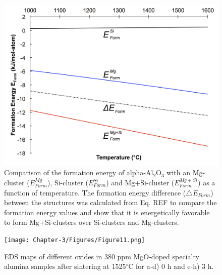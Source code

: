 \newpage
\begin{figure}[H]
	\centering
	\includegraphics[width=\textwidth]{Chapter-3/Figures/Figure10.png}
	\caption{Comparison of the formation energy of alpha-Al$_{2}$O$_{3}$ with an Mg-cluster ($E_{Form}^{Mg}$), Si-cluster ($E_{Form}^{Si}$) and Mg+Si-cluster ($E_{Form}^{Mg+Si}$) as a function of temperature. The formation energy difference ($\bigtriangleup E_{Form}$) between the structures was calculated from Eq. REF to compare the formation energy values and show that it is energetically favorable to form Mg+Si-clusters over Si-clusters and Mg-clusters.}
	\label{Ch3-figure:Figure10}
\end{figure}

\newpage
\begin{figure}[H]
	\centering
	\texttt{[image: Chapter-3/Figures/Figure11.png]}
	\caption{EDS maps of different oxides in 380 ppm MgO-doped specialty alumina samples after sintering at 1525$^{\circ}$C for a-d) 0 h and e-h) 3 h.}
	\label{Ch3-figure:Figure11}
\end{figure}

